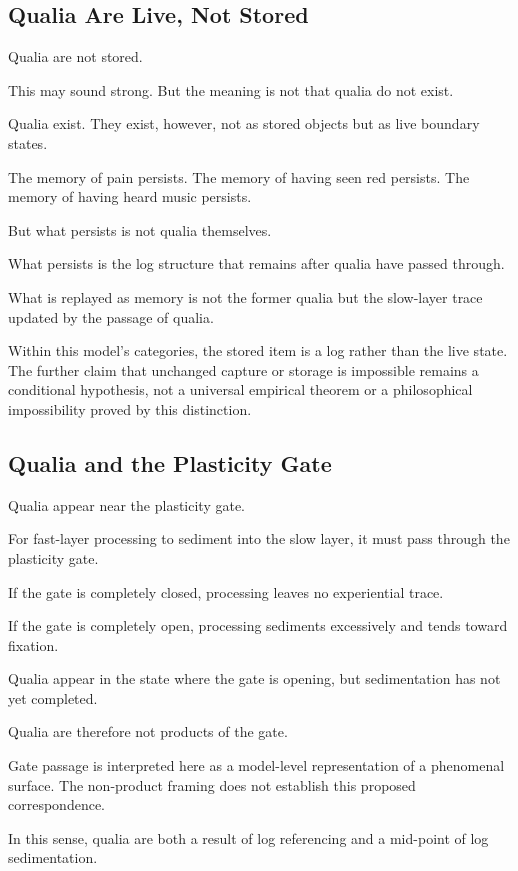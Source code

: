 \subsection{Qualia Are Live, Not Stored}


Qualia are not stored.

This may sound strong. But the meaning is not that qualia do not exist.

Qualia exist. They exist, however, not as stored objects but as live boundary states.

The memory of pain persists. The memory of having seen red persists. The memory of having heard music persists.

But what persists is not qualia themselves.

What persists is the log structure that remains after qualia have passed through.

What is replayed as memory is not the former qualia but the slow-layer trace updated by the passage of qualia.

Within this model's categories, the stored item is a log rather than the live state. The further claim that unchanged capture or storage is impossible remains a conditional hypothesis, not a universal empirical theorem or a philosophical impossibility proved by this distinction.

\subsection{Qualia and the Plasticity Gate}


Qualia appear near the plasticity gate.

For fast-layer processing to sediment into the slow layer, it must pass through the plasticity gate.

If the gate is completely closed, processing leaves no experiential trace.

If the gate is completely open, processing sediments excessively and tends toward fixation.

Qualia appear in the state where the gate is opening, but sedimentation has not yet completed.

Qualia are therefore not products of the gate.

Gate passage is interpreted here as a model-level representation of a phenomenal surface. The non-product framing does not establish this proposed correspondence.

In this sense, qualia are both a result of log referencing and a mid-point of log sedimentation.

